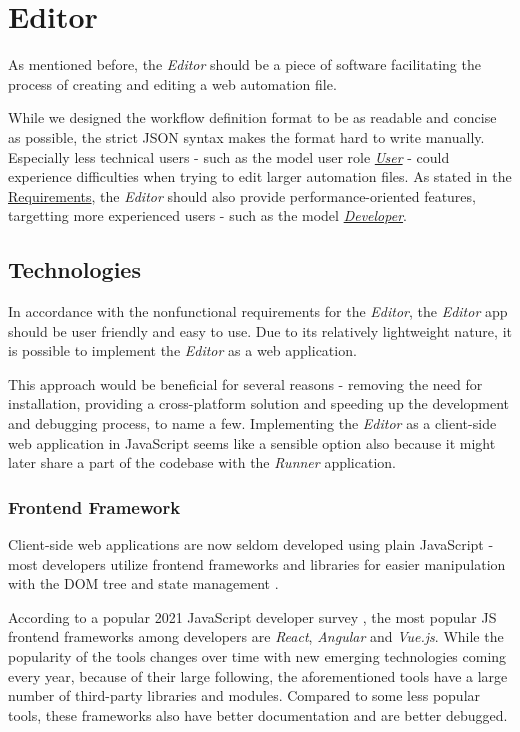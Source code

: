 \section{Editor} \label{sec:editor}

As mentioned before, the \textit{Editor} should be a piece of software facilitating the process of creating and editing a web automation file.

While we designed the workflow definition format to be as readable and concise as possible, the strict JSON syntax makes the format hard to write manually.
Especially less technical users - such as the model user role \hyperref[UserUserRole]{\textit{User}} - could experience difficulties when trying to edit 
larger automation files. 
As stated in the \hyperref[requirements]{Requirements}, the \textit{Editor} should also provide performance-oriented features,
targetting more experienced users - such as the model \hyperref[DevUserRole]{\textit{Developer}}.

\subsection{Technologies}
In accordance with the nonfunctional requirements for the \textit{Editor}, the \textit{Editor} app should be user friendly and easy to use.
Due to its relatively lightweight nature, it is possible to implement the \textit{Editor} as a web application. 

This approach would be beneficial for several reasons - removing the need for installation, providing a cross-platform solution and speeding up the development and debugging process, to name a few.
Implementing the \textit{Editor} as a client-side web application in JavaScript seems like a sensible option also because it might later share a part of the codebase with the \textit{Runner} application.

\subsubsection{Frontend Framework}

Client-side web applications are now seldom developed using plain JavaScript - most developers utilize frontend frameworks and libraries for easier manipulation with the \ac{DOM} tree and state management .

According to a popular 2021 JavaScript developer survey , the most popular \ac{JS} frontend frameworks among developers are \textit{React}, \textit{Angular} and \textit{Vue.js}.
While the popularity of the tools changes over time with new emerging technologies coming every year, because of their large following, the aforementioned tools have a large number of third-party libraries 
and modules. Compared to some less popular tools, these frameworks also have better documentation and are better debugged.

